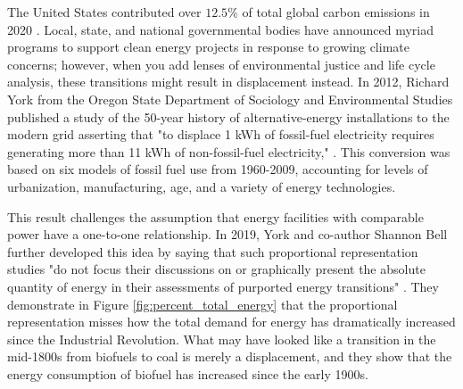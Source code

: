 The United States contributed over $12.5\%$ of total global carbon emissions
in 2020 \cite{european_commission_joint_research_centre_ghg_2021}. Local, state, and national governmental bodies have announced myriad programs to support clean energy projects in response to growing climate concerns; however, when you add lenses of environmental justice and life cycle analysis, these transitions might result in displacement instead. In 2012, Richard York from the Oregon State Department of Sociology and Environmental Studies published a study of the 50-year history of alternative-energy installations to the modern grid asserting that "to displace 1 kWh of fossil-fuel electricity requires
generating more than 11 kWh of non-fossil-fuel electricity,"
\cite{york_alternative_2012}. This conversion was based on six models of fossil
fuel use from 1960-2009, accounting for levels of urbanization, manufacturing,
age, and a variety of energy technologies.

This result challenges the assumption that energy facilities with comparable power have a one-to-one relationship. In 2019, York and co-author
Shannon Bell further developed this idea by saying that such proportional
representation studies "do not focus their discussions on or graphically
present the absolute quantity of energy in their assessments of purported
energy transitions" \cite{york_energy_2019}. They demonstrate in Figure
\ref{fig:percent_total_energy} that the proportional representation misses how
the total demand for energy has dramatically increased since the Industrial
Revolution. What may have looked like a transition in the mid-1800s from
biofuels to coal is merely a displacement, and they show that the energy
consumption of biofuel has increased since the early 1900s.

